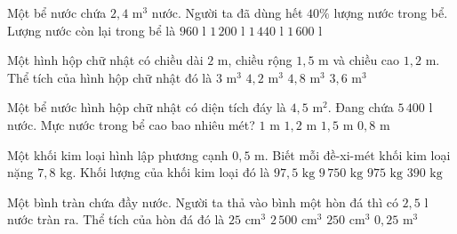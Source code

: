 \begin{ex} %
Một bể nước chứa $2{,}4\text{ m}^3$ nước. Người ta đã dùng hết $40\%$ lượng nước trong bể. Lượng nước còn lại trong bể là
\choice
{$960\text{ l}$}
{$1\,200\text{ l}$}
{\True $1\,440\text{ l}$}
{$1\,600\text{ l}$}
\end{ex}

\begin{ex} %
Một hình hộp chữ nhật có chiều dài $2\text{ m}$, chiều rộng $1{,}5\text{ m}$ và chiều cao $1{,}2\text{ m}$. Thể tích của hình hộp chữ nhật đó là
\choice
{$3\text{ m}^3$}
{$4{,}2\text{ m}^3$}
{$4{,}8\text{ m}^3$}
{\True $3{,}6\text{ m}^3$}
\end{ex}

\begin{ex} %
Một bể nước hình hộp chữ nhật có diện tích đáy là $4{,}5\text{ m}^2$. Đang chứa $5\,400\text{ l}$ nước. Mực nước trong bể cao bao nhiêu mét?
\choice
{$1\text{ m}$}
{\True $1{,}2\text{ m}$}
{$1{,}5\text{ m}$}
{$0{,}8\text{ m}$}
\end{ex}

\begin{ex} %
Một khối kim loại hình lập phương cạnh $0{,}5\text{ m}$. Biết mỗi đề-xi-mét khối kim loại nặng $7{,}8\text{ kg}$. Khối lượng của khối kim loại đó là
\choice
{$97{,}5\text{ kg}$}
{$9\,750\text{ kg}$}
{\True $975\text{ kg}$}
{$390\text{ kg}$}
\end{ex}

\begin{ex} %
Một bình tràn chứa đầy nước. Người ta thả vào bình một hòn đá thì có $2{,}5\text{ l}$ nước tràn ra. Thể tích của hòn đá đó là
\choice
{$25\text{ cm}^3$}
{\True $2\,500\text{ cm}^3$}
{$250\text{ cm}^3$}
{$0{,}25\text{ m}^3$}
\end{ex}


